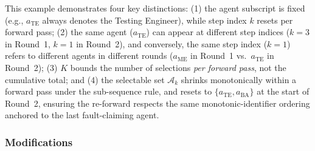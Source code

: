 \documentclass[11pt,a4paper]{article}
\begin{document}
\noindent This example demonstrates four key distinctions: (1) the agent subscript is fixed (e.g., $a_{\text{TE}}$ always denotes the Testing Engineer), while step index $k$ resets per forward pass; (2) the same agent ($a_{\text{TE}}$) can appear at different step indices ($k\!=\!3$ in Round~1, $k\!=\!1$ in Round~2), and conversely, the same step index ($k\!=\!1$) refers to different agents in different rounds ($a_{\text{ME}}$ in Round~1 vs.\ $a_{\text{TE}}$ in Round~2); (3) $K$ bounds the number of selections \textit{per forward pass}, not the cumulative total; and (4) the selectable set $\mathcal{A}_k$ shrinks monotonically within a forward pass under the sub-sequence rule, and resets to $\{a_{\text{TE}},a_{\text{BA}}\}$ at the start of Round~2, ensuring the re-forward respects the same monotonic-identifier ordering anchored to the last fault-claiming agent.

\subsubsection{Modifications}
\end{document}
